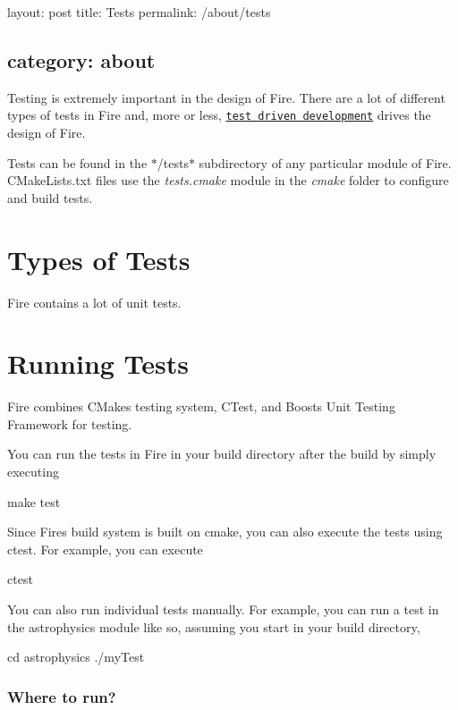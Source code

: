 

 layout\+: post title\+: Tests permalink\+: /about/tests \subsection*{category\+: about }

Testing is extremely important in the design of Fire. There are a lot of different types of tests in Fire and, more or less, \href{https://en.wikipedia.org/wiki/Test-driven_development}{\tt test driven development} drives the design of Fire.

Tests can be found in the $\ast$/tests$\ast$ subdirectory of any particular module of Fire. C\+Make\+Lists.\+txt files use the {\itshape tests.\+cmake} module in the {\itshape cmake} folder to configure and build tests.

\section*{Types of Tests}

Fire contains a lot of unit tests.

\section*{Running Tests}

Fire combines C\+Make\textquotesingle{}s testing system, C\+Test, and Boost\textquotesingle{}s Unit Testing Framework for testing.

You can run the tests in Fire in your build directory after the build by simply executing


\begin{DoxyCode}
make test
\end{DoxyCode}


Since Fire\textquotesingle{}s build system is built on cmake, you can also execute the tests using ctest. For example, you can execute


\begin{DoxyCode}
ctest
\end{DoxyCode}


You can also run individual tests manually. For example, you can run a test in the astrophysics module like so, assuming you start in your build directory,


\begin{DoxyCode}
cd astrophysics
./myTest
\end{DoxyCode}


\subsubsection*{Where to run?}

